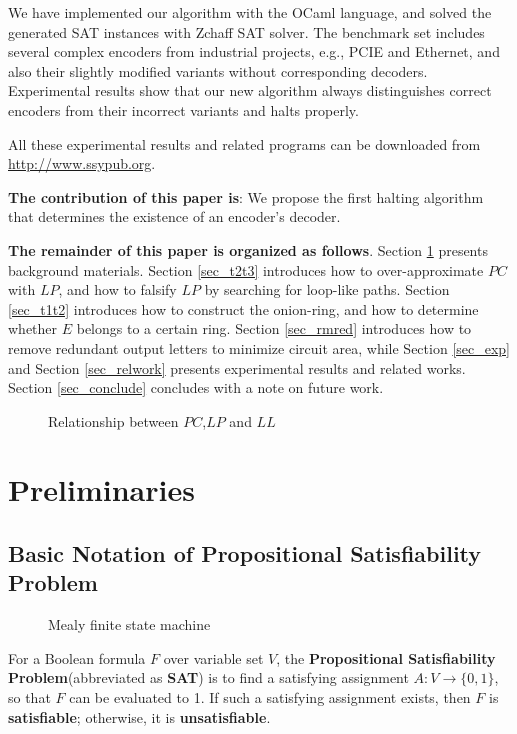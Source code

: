\documentclass[journal]{IEEEtran}
\begin{document}
We have implemented our algorithm with the OCaml language,
and solved the generated SAT instances with Zchaff SAT solver\cite{CHAFF}.
The benchmark set includes several complex encoders from industrial projects,
e.g.,
PCIE and Ethernet,
and also their slightly modified variants without corresponding decoders.
Experimental results show that
our new algorithm always distinguishes correct encoders from their incorrect variants and halts properly.

All these experimental results and related programs can be downloaded from \url{http://www.ssypub.org}.

\textbf{The contribution of this paper is}:
We propose the first halting algorithm that determines the existence of an encoder's decoder.

\textbf{The remainder of this paper is organized as follows}.
Section \ref{sec_prem} presents background materials.
Section \ref{sec_t2t3} introduces how to over-approximate $PC$ with $LP$,
and how to falsify $LP$ by searching for loop-like paths.
Section \ref{sec_t1t2} introduces how to construct the onion-ring,
and how to determine whether $E$ belongs to a certain ring.
Section \ref{sec_rmred} introduces how to remove redundant output letters to minimize circuit area,
while Section \ref{sec_exp} and Section \ref{sec_relwork} presents experimental results and related works.
Section \ref{sec_conclude} concludes with a note on future work.
\begin{figure}[b]
\begin{center}
\end{center}
\caption{Relationship between $PC$,$LP$ and $LL$}
  \label{f123}
\end{figure}

\section{Preliminaries}\label{sec_prem}

\subsection{Basic Notation of Propositional Satisfiability Problem}\label{subsec_SAT}
\begin{figure}[t]
\begin{center}
\end{center}
\caption{Mealy finite state machine}
  \label{mealy}
\end{figure}

For a Boolean formula $F$ over variable set $V$,
the \textbf{Propositional Satisfiability Problem}(abbreviated as \textbf{SAT}) is to find a satisfying assignment $A:V\to \{0,1\}$,
so that $F$ can be evaluated to 1.
If such a satisfying assignment exists, then $F$ is \textbf{satisfiable};
otherwise,
it is \textbf{unsatisfiable}.
\end{document}
